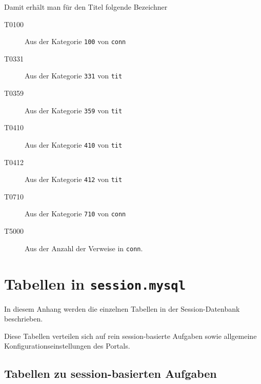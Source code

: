 \documentclass[11pt, twoside, a4paper, BCOR8mm, DIV12, bibtotoc,idxtotoc]{scrbook}
\begin{document}
Damit erhält man für den Titel folgende Bezeichner

\begin{description}
\item[T0100] Aus der Kategorie \texttt{100} von \texttt{conn}
\item[T0331] Aus der Kategorie \texttt{331} von \texttt{tit}
\item[T0359] Aus der Kategorie \texttt{359} von \texttt{tit}
\item[T0410] Aus der Kategorie \texttt{410} von \texttt{tit}
\item[T0412] Aus der Kategorie \texttt{412} von \texttt{tit}
\item[T0710] Aus der Kategorie \texttt{710} von \texttt{conn}
\item[T5000] Aus der Anzahl der Verweise in \texttt{conn}.
\end{description}

\appendix

\chapter{Tabellen in \texttt{session.mysql}}

In diesem Anhang werden die einzelnen Tabellen in der
Session-Datenbank beschrieben.

Diese Tabellen verteilen sich auf rein session-basierte Aufgaben sowie
allgemeine Konfigurations\-ein\-stellungen des Portals.


\section{Tabellen zu session-basierten Aufgaben}
\end{document}
